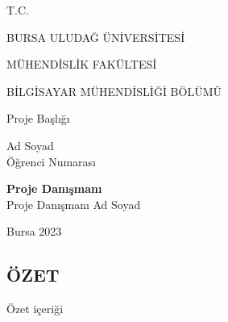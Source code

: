 \documentclass[hidelinks,12pt]{article}
\begin{document}
\newpage
\thispagestyle{empty}
    \begin{center}
    T.C. \\
    \end{center}
    \begin{center}
    BURSA ULUDAĞ ÜNİVERSİTESİ \\
    \end{center}
    \begin{center}
    MÜHENDİSLİK FAKÜLTESİ \\
    \end{center}
    \begin{center}
    BİLGİSAYAR MÜHENDİSLİĞİ BÖLÜMÜ \\
    \end{center}
    \hfill \break
    \newline
    \newline
    \newline
    \begin{center}
        \large{Proje Başlığı}
    \end{center}
    \hfill \break
    \newline
    \begin{center}
        Ad Soyad\\Öğrenci Numarası\\
    \end{center}
    \hfill \break
    \newline
    \newline
    \newline
    \newline
    \begin{center}
        \textbf{Proje Danışmanı} \\ Proje Danışmanı Ad Soyad
    \end{center}
    \hfill \break
    \newline
    \newline
    \newline
    \newline
    \newline
    \newline
    \newline
    \hfill \break
    \begin{center}
        Bursa 2023
    \end{center}
\newpage

\setcounter{page}{2}
\begin{center}
\section*{\centering ÖZET}
\end{center}
\quad Özet içeriği
\end{document}
